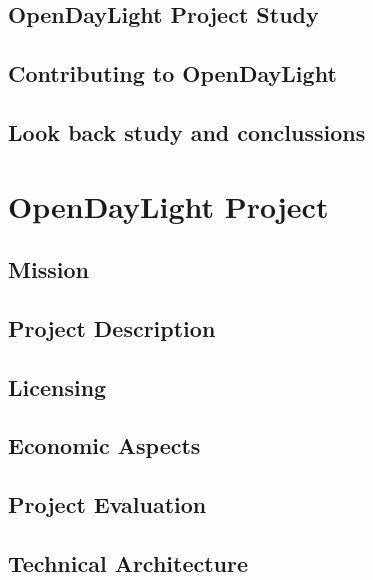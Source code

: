 \documentclass[a4paper, 12pt]{book}
\begin{document}
\section{OpenDayLight Project Study}
\label{sec:ob_opendaylight}

\section{Contributing to OpenDayLight}
\label{sec:ob_opendaylight_mission}

\section{Look back study and conclussions}
\label{sec:ob_lookback}


\chapter{OpenDayLight Project}
\label{chap:opendaylight}

\section{Mission}
\label{sec:od_mission}

\section{Project Description}
\label{sec:od_description}

\section{Licensing}
\label{sec:od_licensing}

\section{Economic Aspects}
\label{sec:od_economing}

\section{Project Evaluation}
\label{sec:od_evaluation}

\section{Technical Architecture}
\label{sec:od_techarch}
\end{document}
